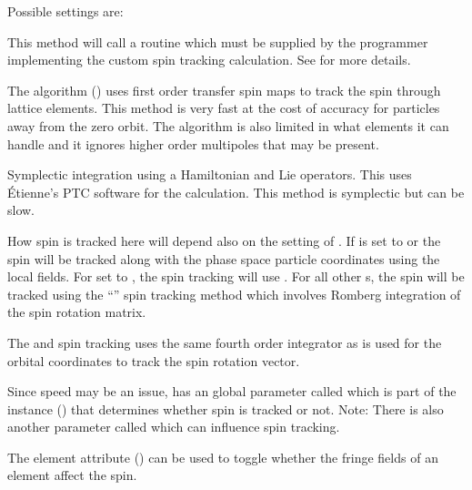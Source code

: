 Possible  settings are:
\begin{description}
%
\item[\vn{Custom}] \Newline
This method will call a routine  which must be supplied by the programmer
implementing the custom spin tracking calculation. See  for more details.
%
\item[\vn{Sprint}] \Newline
The  algorithm () uses first order transfer spin maps to track the
spin through lattice elements. This method is very fast at the cost of accuracy for particles away
from the zero orbit. The algorithm is also limited in what elements it can handle and it ignores
higher order multipoles that may be present.
%
\item[\vn{Symp_Lie_PTC}] \Newline
Symplectic integration using a Hamiltonian and Lie operators.  This uses \'Etienne's PTC software
for the calculation.  This method is symplectic but can be slow.
%
\item[\vn{Tracking}] \Newline
How spin is tracked here will depend also on the setting of . If
 is set to  or  the spin will be tracked
along with the phase space particle coordinates using the local fields. For  set
to , the spin tracking will use .  For all other s, the
spin will be tracked using the ``'' spin tracking method which involves Romberg
integration of the spin rotation matrix.

The  and  spin tracking uses the same fourth order integrator
as is used for the orbital coordinates to track the spin rotation vector.
\end{description}

Since speed may be an issue, \bmad has an global parameter called  which is
part of the  instance () that determines whether spin is tracked or
not. Note: There is also another  parameter called 
which can influence spin tracking.

The  element attribute () can be used to toggle whether the
fringe fields of an element affect the spin.

